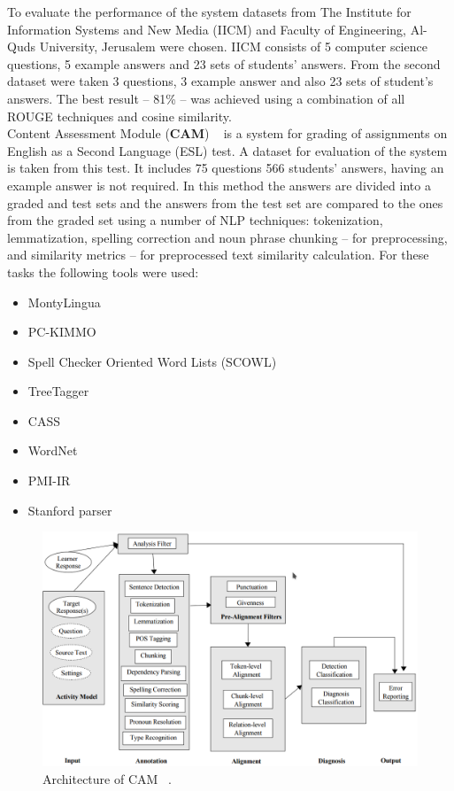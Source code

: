 To evaluate the performance of the system datasets from The Institute for Information Systems and New Media (IICM) and Faculty of Engineering, Al-Quds University, Jerusalem were chosen. IICM consists of 5 computer science questions, 5 example answers and 23 sets of students' answers. From the second dataset were taken 3 questions, 3 example answer and also 23 sets of student's answers. The best result -- 81\% -- was achieved using a combination of all ROUGE techniques and cosine similarity.\\

Content Assessment Module (\textbf{CAM}) ~\cite{CAM} is a system for grading of assignments on  English as a Second Language (ESL) test. A dataset for evaluation of the system is taken from this test. It includes 75 questions 566 students' answers, having an example answer is not required. In this method the answers are divided into a graded and test sets and the answers from the test set are compared to the ones from the graded set using a number of NLP techniques: tokenization, lemmatization, spelling correction and noun phrase chunking -- for preprocessing, and similarity metrics -- for preprocessed text similarity calculation. For these tasks the following tools were used:
\begin{itemize}
\item MontyLingua
\item PC-KIMMO
\item Spell Checker Oriented Word Lists (SCOWL)
\item TreeTagger
\item CASS
\item WordNet
\item PMI-IR 
\item Stanford parser
\end{itemize}


\begin{figure}[h!]
  \centering
  \includegraphics[width=\textwidth]{img/CAM}
    \caption{ Architecture of CAM ~\cite{CAM}. }\label{fig:CAM}
\end{figure}


